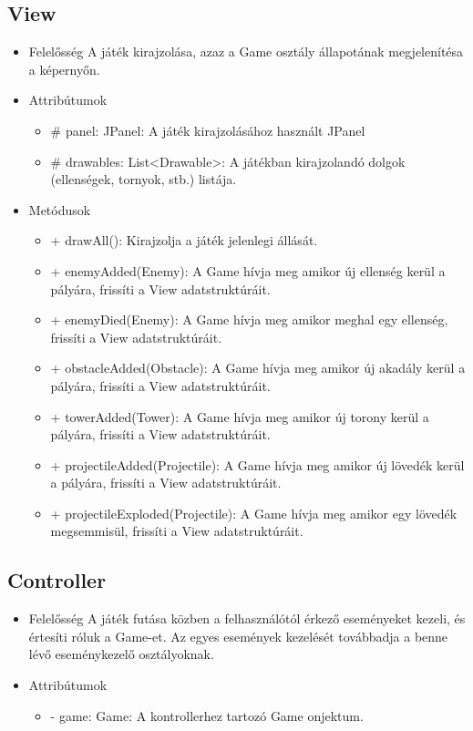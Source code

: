 \subsection{View}
\begin{itemize}
\item Felelősség\newline
A játék kirajzolása, azaz a Game osztály állapotának megjelenítésa a képernyőn.
\item Attribútumok\newline
	\begin{itemize}
		\item \# panel: JPanel: A játék kirajzolásához használt JPanel
		\item \# drawables: List<Drawable>: A játékban kirajzolandó dolgok (ellenségek, tornyok, stb.) listája.
	\end{itemize}
\item Metódusok\newline
	\begin{itemize}
		\item + drawAll(): Kirajzolja a játék jelenlegi állását.
		\item + enemyAdded(Enemy): A Game hívja meg amikor új ellenség kerül a pályára, frissíti a View adatstruktúráit.
		\item + enemyDied(Enemy): A Game hívja meg amikor meghal egy ellenség, frissíti a View adatstruktúráit.
		\item + obstacleAdded(Obstacle): A Game hívja meg amikor új akadály kerül a pályára, frissíti a View adatstruktúráit.
		\item + towerAdded(Tower): A Game hívja meg amikor új torony kerül a pályára, frissíti a View adatstruktúráit.
		\item + projectileAdded(Projectile): A Game hívja meg amikor új lövedék kerül a pályára, frissíti a View adatstruktúráit.
		\item + projectileExploded(Projectile): A Game hívja meg amikor egy lövedék megsemmisül, frissíti a View adatstruktúráit.
	\end{itemize}
\end{itemize}

\subsection{Controller}
\begin{itemize}
\item Felelősség\newline
A játék futása közben a felhasználótól érkező eseményeket kezeli, és értesíti róluk a Game-et. Az egyes események kezelését továbbadja a benne lévő eseménykezelő osztályoknak.
\item Attribútumok\newline
	\begin{itemize}
		\item - game: Game: A kontrollerhez tartozó Game onjektum.
	\end{itemize}
\end{itemize}

